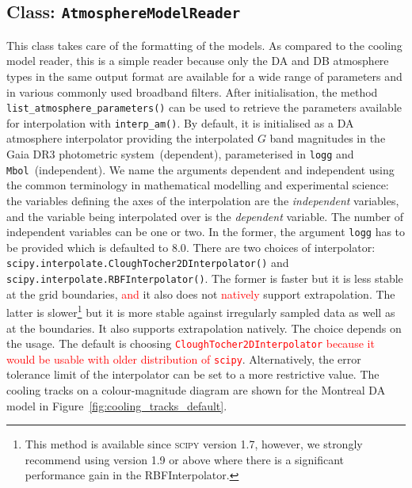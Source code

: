 \documentclass[fleqn,usenatbib]{rasti}
\begin{document}
\subsection{Class: \texttt{AtmosphereModelReader}}
This class takes care of the formatting of the models. As compared to the
cooling model reader, this is a simple reader because only the DA and DB
atmosphere types in the same output format are available for a wide range of
parameters and in various commonly used broadband filters. After initialisation,
the method \verb+list_atmosphere_parameters()+ can be used to retrieve the
parameters available for interpolation with \verb+interp_am()+. By default, it
is initialised as a DA atmosphere interpolator providing the interpolated $G$
band magnitudes in the Gaia DR3 photometric system~(dependent), parameterised
in \verb+logg+ and \verb+Mbol+~(independent). We name the arguments dependent
and independent using the common terminology in mathematical modelling and
experimental science: the variables defining the axes of the interpolation are
the \textit{independent} variables, and the variable being interpolated over
is the \textit{dependent} variable. The number of independent variables can be
one or two. In the former, the argument \verb+logg+ has to be provided which
is defaulted to $8.0$. There are two choices of interpolator:
\verb+scipy.interpolate.CloughTocher2DInterpolator()+ and 
\verb+scipy.interpolate.RBFInterpolator()+. The former is faster but it is less
stable at the grid boundaries, \textcolor{red}{and} it also does not \textcolor{red}{natively} support extrapolation. The
latter is slower\footnote{This method is available since \textsc{scipy}
version 1.7, however, we strongly recommend using version 1.9 or above where
there is a significant performance gain in the RBFInterpolator.} but it is more
stable against irregularly sampled data as well as at the boundaries. It also
supports extrapolation natively. The choice depends on the usage. The
default is choosing \textcolor{red}{\verb+CloughTocher2DInterpolator+ because
it would be usable with older distribution of \texttt{scipy}}.
Alternatively, the error tolerance limit of the interpolator can be set to a
more restrictive value. The cooling tracks on a colour-magnitude diagram are
shown for the Montreal DA model in Figure~\ref{fig:cooling_tracks_default}.
\end{document}
